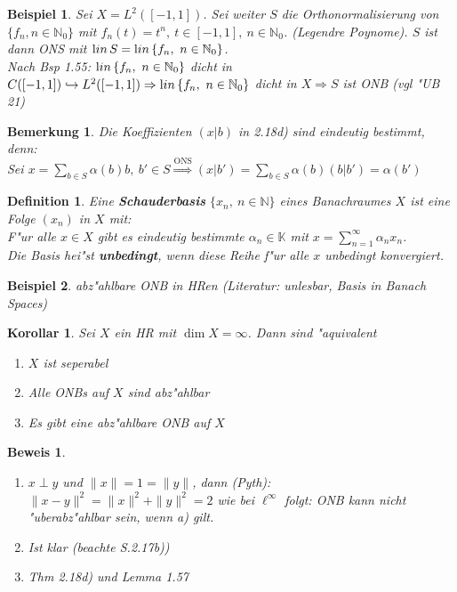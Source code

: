 \documentclass[a4paper,11pt]{book}
\newcommand{\N}{{\mathbb N}}
\newcommand{\K}{{\mathbb K}}
\newcommand{\begriff}[1]{\textbf{#1}} %
\newcommand{\lin}{\ensuremath{\text lin}\,} %
\newtheorem*{DefNO}{Definition}
\newtheorem{Kor}[Def]{Korollar}
\newtheorem*{BspNO}{Beispiel}
\newtheorem{Bem}[Def]{Bemerkung}
\theoremstyle{nonumberplain}
\newtheorem{Bew}{Beweis}
\begin{document}
\begin{BspNO}
Sei $X = L^2([-1,1])$. Sei weiter $S$ die Orthonormalisierung von $\{ f_n, n \in \N_0\}$ mit $f_n(t) = t^n,\ t \in [-1,1],\ n\in \N_0$. (Legendre Poynome). $S$ ist dann ONS mit $\lin S = \lin \{f_n,\ n \in \N_0\}$.\\
Nach Bsp 1.55: $\lin \{f_n,\ n \in \N_0\}$ dicht in $C([-1,1]) \hookrightarrow L^2([-1,1]) \Rightarrow \lin \{f_n,\ n \in \N_0\}$ dicht in $X \Rightarrow S$ ist ONB (vgl "UB 21)
\end{BspNO}


\begin{Bem}
Die Koeffizienten $(x|b)$ in 2.18d) sind eindeutig bestimmt, denn:\\
Sei $x = \sum_{b \in S} \alpha(b) b,\ b' \in S \stackrel{\text{ONS}}{\Rightarrow} (x|b') = \sum_{b \in S} \alpha(b)(b|b') = \alpha (b')$
\end{Bem}


\begin{DefNO}
Eine \begriff{Schauderbasis} $\{x_n,\ n \in \N\}$ eines Banachraumes $X$ ist eine Folge $(x_n)$ in $X$ mit:\\
F"ur alle $x \in X$ gibt es eindeutig bestimmte $\alpha_n \in \K$ mit $x = \sum_{n=1}^{\infty} \alpha_n x_n$.\\
Die Basis hei"st \begriff{unbedingt}, wenn diese Reihe f"ur alle $x$ unbedingt konvergiert.
\end{DefNO}


\begin{BspNO}
abz"ahlbare ONB in HRen (Literatur: unlesbar, Basis in Banach Spaces)
\end{BspNO}



\begin{Kor}
Sei $X$ ein HR mit $\dim X = \infty$. Dann sind "aquivalent
\begin{enumerate}
\item[a)] $X$ ist seperabel

\item[b)] Alle ONBs auf $X$ sind abz"ahlbar

\item[c)] Es gibt eine abz"ahlbare ONB auf $X$
\end{enumerate}
\end{Kor}


\begin{Bew}\\
\begin{enumerate}
\item[a) $\Rightarrow$ b)] $x \perp y$ und $\|x\| = 1 = \|y\|$, dann (Pyth): $\|x-y\|^2 = \|x\|^2 + \|y\|^2 = 2$ wie bei $\ell^{\infty}$ folgt: ONB kann nicht "uberabz"ahlbar sein, wenn a) gilt.

\item[b) $\Rightarrow$ c)] Ist klar (beachte S.2.17b))

\item[c) $\Rightarrow$ a)] Thm 2.18d) und Lemma 1.57
\end{enumerate}
\end{Bew}
\end{document}
